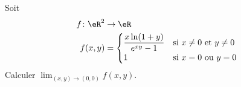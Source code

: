 \begin{exercice}[\boringexo]\label{exoLimiteContinue0007}

Soit 
\begin{equation}
	\begin{aligned}
		f\colon \eR^2&\to \eR \\
		f(x,y)&=
		\begin{cases}
			\displaystyle\frac{x \ln(1+y)}{e^{xy}-1}	&	\text{si $x\neq 0$ et $y\neq 0$}\\
			1	&	 \text{si $x=0$ ou $y=0$}
		\end{cases}
	\end{aligned}
\end{equation}
Calculer $\lim_{(x,y)\to(0,0)}f(x,y)$.

\end{exercice}
